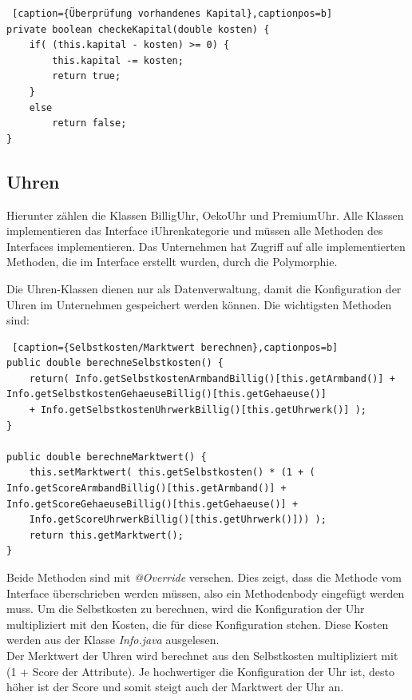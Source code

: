 \lstset{language=Java}
\begin{lstlisting} [caption={Überprüfung vorhandenes Kapital},captionpos=b]
private boolean checkeKapital(double kosten) {
	if( (this.kapital - kosten) >= 0) {
		this.kapital -= kosten;
		return true;
	}
	else
		return false;
}
\end{lstlisting}

\subsection{Uhren}
Hierunter zählen die Klassen BilligUhr, OekoUhr und PremiumUhr. Alle Klassen implementieren das Interface iUhrenkategorie und müssen alle Methoden des Interfaces implementieren. Das Unternehmen hat Zugriff auf alle implementierten Methoden, die im Interface erstellt wurden, durch die Polymorphie. 

Die Uhren-Klassen dienen nur als Datenverwaltung, damit die Konfiguration der Uhren im Unternehmen gespeichert werden können. Die wichtigsten Methoden sind: 

\lstset{language=Java}
\begin{lstlisting} [caption={Selbstkosten/Marktwert berechnen},captionpos=b]
public double berechneSelbstkosten() {
	return( Info.getSelbstkostenArmbandBillig()[this.getArmband()] + Info.getSelbstkostenGehaeuseBillig()[this.getGehaeuse()] 
	+ Info.getSelbstkostenUhrwerkBillig()[this.getUhrwerk()] );
}

public double berechneMarktwert() {
	this.setMarktwert( this.getSelbstkosten() * (1 + ( Info.getScoreArmbandBillig()[this.getArmband()] + Info.getScoreGehaeuseBillig()[this.getGehaeuse()] + 
	Info.getScoreUhrwerkBillig()[this.getUhrwerk()])) ); 
	return this.getMarktwert();
}
\end{lstlisting}

Beide Methoden sind mit \textit{@Override} versehen. Dies zeigt, dass die Methode vom Interface überschrieben werden müssen, also ein Methodenbody eingefügt werden muss. Um die Selbstkosten zu berechnen, wird die Konfiguration der Uhr multipliziert mit den Kosten, die für diese Konfiguration stehen. Diese Kosten werden aus der Klasse \textit{Info.java} ausgelesen.\\

Der Merktwert der Uhren wird berechnet aus den Selbstkosten multipliziert mit (1 + Score der Attribute). Je hochwertiger die Konfiguration der Uhr ist, desto höher ist der Score und somit steigt auch der Marktwert der Uhr an.

